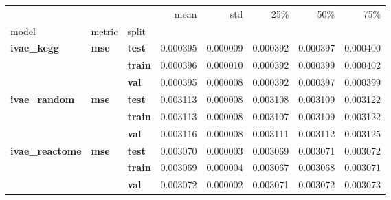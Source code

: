 \begin{tabular}{lllrrrrr}
\toprule
 &  &  & mean & std & 25\% & 50\% & 75\% \\
model & metric & split &  &  &  &  &  \\
\midrule
\multirow[t]{3}{*}{\textbf{ivae\_kegg}} & \multirow[t]{3}{*}{\textbf{mse}} & \textbf{test} & 0.000395 & 0.000009 & 0.000392 & 0.000397 & 0.000400 \\
\textbf{} & \textbf{} & \textbf{train} & 0.000396 & 0.000010 & 0.000392 & 0.000399 & 0.000402 \\
\textbf{} & \textbf{} & \textbf{val} & 0.000395 & 0.000008 & 0.000392 & 0.000397 & 0.000399 \\
\cline{1-8} \cline{2-8}
\multirow[t]{3}{*}{\textbf{ivae\_random}} & \multirow[t]{3}{*}{\textbf{mse}} & \textbf{test} & 0.003113 & 0.000008 & 0.003108 & 0.003109 & 0.003122 \\
\textbf{} & \textbf{} & \textbf{train} & 0.003113 & 0.000008 & 0.003107 & 0.003109 & 0.003122 \\
\textbf{} & \textbf{} & \textbf{val} & 0.003116 & 0.000008 & 0.003111 & 0.003112 & 0.003125 \\
\cline{1-8} \cline{2-8}
\multirow[t]{3}{*}{\textbf{ivae\_reactome}} & \multirow[t]{3}{*}{\textbf{mse}} & \textbf{test} & 0.003070 & 0.000003 & 0.003069 & 0.003071 & 0.003072 \\
\textbf{} & \textbf{} & \textbf{train} & 0.003069 & 0.000004 & 0.003067 & 0.003068 & 0.003071 \\
\textbf{} & \textbf{} & \textbf{val} & 0.003072 & 0.000002 & 0.003071 & 0.003072 & 0.003073 \\
\cline{1-8} \cline{2-8}
\bottomrule
\end{tabular}
